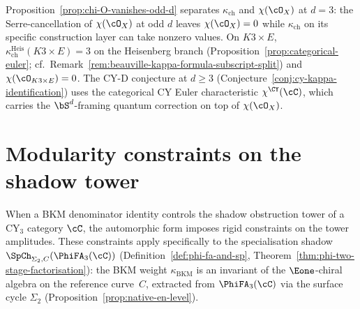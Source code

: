 \begin{remark}[Consequence for CY-D at \texorpdfstring{$d = 3$}{d = 3}]
\label{rem:chi-O-obstruction-cy-d}
Proposition~\textup{\ref{prop:chi-O-vanishes-odd-d}} separates
$\kappa_{\mathrm{ch}}$ and $\chi(\cO_X)$ at $d = 3$: the
Serre-cancellation of $\chi(\cO_X)$ at odd $d$ leaves $\chi(\cO_X) = 0$
while $\kappa_{\mathrm{ch}}$ on its specific construction layer can
take nonzero values. On $K3 \times E$,
$\kappa_{\mathrm{ch}}^{\mathrm{Heis}}(K3 \times E) = 3$ on the
Heisenberg branch (Proposition~\textup{\ref{prop:categorical-euler}};
cf.\ Remark~\ref{rem:beauville-kappa-formula-subscript-split}) and
$\chi(\cO_{K3 \times E}) = 0$. The CY-D conjecture at $d \geq 3$
(Conjecture~\textup{\ref{conj:cy-kappa-identification}}) uses the
categorical CY Euler characteristic $\chi^{\CY}(\cC)$, which carries
the $\bS^d$-framing quantum correction on top of $\chi(\cO_X)$.
\end{remark}


\section{Modularity constraints on the shadow tower}
\label{sec:modularity-constraints}

When a BKM denominator identity controls the shadow obstruction tower of a CY$_3$ category $\cC$, the automorphic form imposes rigid constraints on the tower amplitudes. These constraints apply specifically to the specialisation shadow $\SpCh_{\Sigma_2, C}(\PhiFA_3(\cC))$ (Definition~\ref{def:phi-fa-and-sp}, Theorem~\ref{thm:phi-two-stage-factorisation}): the BKM weight $\kappa_{\mathrm{BKM}}$ is an invariant of the $\Eone$-chiral algebra on the reference curve~$C$, extracted from $\PhiFA_3(\cC)$ via the surface cycle $\Sigma_2$ (Proposition~\ref{prop:native-en-level}).

